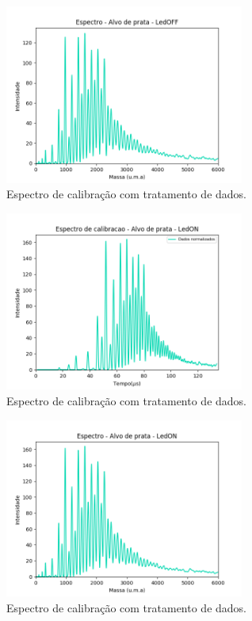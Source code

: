 \begin{figure}
  \centering  
  \includegraphics[width=0.7\textwidth]{exp_04/LEDOFF_espec_calib_ag_massa.png}
  \caption{Espectro de calibração com tratamento de dados.}
  \label{fig:04_ledoff_massa} 
\end{figure}



\begin{figure}
  \centering  
  \includegraphics[width=0.7\textwidth]{exp_04/LEDON_normalizado_mcp.png}
  \caption{Espectro de calibração com tratamento de dados.}
  \label{fig:04_ledon_dados_tratados} 
\end{figure}

\begin{figure}
  \centering  
  \includegraphics[width=0.7\textwidth]{exp_04/LEDON_espec_calib_ag_massa.png}
  \caption{Espectro de calibração com tratamento de dados.}
  \label{fig:04_ledon_massa} 
\end{figure}


